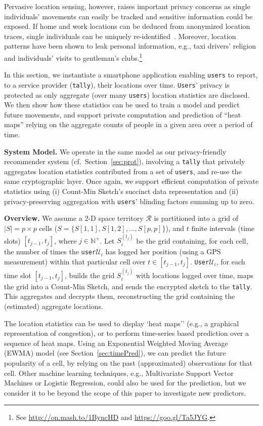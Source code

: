 \documentclass[conference]{IEEEtran}
\newcommand{\descr}[1]{\medskip \noindent \textbf{#1}}
\newcommand{\Ui}{\mathcal{U}_i}
\newcommand{\user}{{\tt user}\xspace}
\newcommand{\users}{{\tt users}\xspace}
\newcommand{\User}{{\tt User}\xspace}
\newcommand{\Users}{{\tt Users}\xspace}
\newcommand{\tally}{{\tt tally}\xspace}
\begin{document}
Pervasive location sensing, however, raises important privacy concerns as single individuals' movements can easily be tracked and sensitive information could be exposed. If home and work locations can be deduced from anonymized location traces, single individuals can be uniquely re-identified~\cite{golle2009anonymity}.
Moreover, location patterns have been shown to leak personal information, e.g., taxi drivers' religion and individuals' visits to gentleman's clubs.\footnote{See \url{http://on.mash.to/1ByncHD} and \url{https://goo.gl/Ta5JYG}.} 

In this section, we instantiate a smartphone application enabling \users to report, to a service provider (\tally), their locations over time. \Users' privacy is protected as only aggregate (over many \users) location statistics are disclosed. We then show how these statistics can be used to train a model and predict future movements, and support private computation and prediction of ``heat maps'' relying on the aggregate counts of people in a given area over a period of time. 

\descr{System Model.} We operate in the same model as our privacy-friendly recommender system (cf.~Section~\ref{sec:prot}), involving a \tally that privately aggregates location statistics contributed from a set of \users, and re-use the same cryptographic layer. Once again, we support efficient computation of private statistics using (i) Count-Min Sketch's succinct data representation and (ii) privacy-preserving aggregation with \users' blinding factors summing up to zero.

\descr{Overview.} We assume a 2-D space territory $\mathcal{R}$ is partitioned into a grid of $|S| = p \times p$ cells ($S = \lbrace{ S[1,1], S[1,2], \dots, S[p,p]  \rbrace}$), and $t$ finite intervals (time slots) $\left[ t_{j-1}, t_{j} \right]$, where $j \in \mathbb{N}^+$.
Let $S_i^{(t_j)}$ be the grid containing, for each cell, the number of times the \user $\Ui$ has logged her position (using a GPS measurement) within that particular cell over $t \in \left[ t_{j-1}, t_{j} \right] $.
\User $\Ui$, for each time slot $\left[ t_{j-1}, t_{j} \right]$, builds the grid $S_i^{(t_j)}$ with locations logged over time, maps the grid into a Count-Min Sketch, and sends the encrypted sketch to the \tally. 
This aggregates and decrypts them, reconstructing the grid containing the (estimated) aggregate locations. 

The location statistics can be used to display `heat maps'' (e.g., a graphical representation of congestion), or to perform time-series based prediction over a sequence of heat maps.
Using an Exponential Weighted Moving Average (EWMA) model (see Section~\ref{sec:timePred}), we can predict the future popularity of a cell, by relying on the past (approximated) observations for that cell.
Other machine learning techniques, e.g., Multivariate Support Vector Machines or Logistic Regression, could also be used for the prediction, but we consider it to be beyond the scope of this paper to investigate new predictors.
\end{document}
